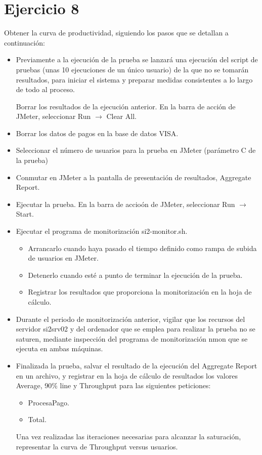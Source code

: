 \documentclass[a4paper, 10pt]{article}
\begin{document}
\section{Ejercicio 8}
\begin{mdframed}

Obtener la curva de productividad, siguiendo los pasos que se detallan a continuación:
\begin{itemize}
	\item Previamente a la ejecución de la prueba se lanzará una ejecución del script de pruebas (unas 10 ejecuciones de un único usuario) de la que no se tomarán resultados, para iniciar el sistema y preparar medidas consistentes a lo largo de todo al proceso.

	Borrar los resultados de la ejecución anterior. En la barra de acción de JMeter, seleccionar Run $\rightarrow$ Clear All.

	\item Borrar los datos de pagos en la base de datos VISA.
	\item Seleccionar el número de usuarios para la prueba en JMeter (parámetro C de la prueba)
	\item Conmutar en JMeter a la pantalla de presentación de resultados, Aggregate Report.
	\item Ejecutar la prueba. En la barra de accioón de JMeter, seleccionar Run $\rightarrow$ Start.
	\item Ejecutar el programa de monitorización si2-monitor.sh.
	\begin{itemize}
		\item Arrancarlo cuando haya pasado el tiempo definido como rampa de subida de usuarios en JMeter.
		\item Detenerlo cuando esté a punto de terminar la ejecución de la prueba.
		\item Registrar los resultados que proporciona la monitorización en la hoja de cálculo.
	\end{itemize}
	\item Durante el periodo de monitorización anterior, vigilar que los recursos del servidor si2srv02 y del ordenador que se emplea para realizar la prueba no se saturen, mediante inspección del programa de monitorización nmon que se ejecuta en ambas máquinas.
	\item Finalizada la prueba, salvar el resultado de la ejecución del Aggregate Report en un archivo, y registrar en la hoja de cálculo de resultados los valores Average, 90\% line y Throughput para las siguientes peticiones:
	\begin{itemize}
		\item ProcesaPago.
		\item Total.
	\end{itemize}
	Una vez realizadas las iteraciones necesarias para alcanzar la saturación, representar la curva de Throughput versus usuarios.
\end{itemize}

\end{mdframed}
\end{document}
